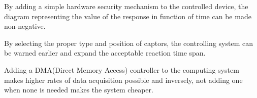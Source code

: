 \documentclass[../main.tex]{subfiles}
\begin{document}
\begin{exmp}
By adding a simple hardware security mechanism to the controlled device, the diagram representing the value of the response in function of time can be made non-negative.
\end{exmp}

\begin{exmp}
By selecting the proper type and position of captors, the controlling system can be warned earlier and expand the acceptable reaction time span.
\end{exmp}

\begin{exmp}
Adding a DMA(Direct Memory Access) controller to the computing system makes higher rates of data acquisition possible and inversely, not adding one when none is needed makes the system cheaper.
\end{exmp}
\end{document}
